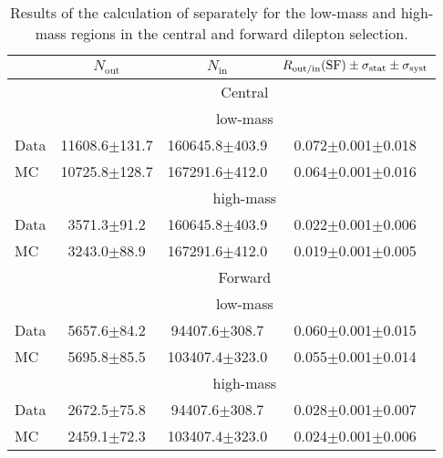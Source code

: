 
\begin{table}[hbtp]
 \renewcommand{\arraystretch}{1.3}
 \setlength{\belowcaptionskip}{6pt}
 \centering
 \caption{Results of the calculation of \Routin separately for the low-mass and high-mass regions in the central and forward dilepton selection.}
  \label{tab:rOutIn}
\begin{tabular}{l|c|c|c}     
 & $N_{\text{out}}$ & $N_{\text{in}}$ & $ R_\text{out/in} (\text{SF}) \pm \sigma_{\text{stat}} \pm \sigma_{\text{syst}}$  \\    
\hline
 & \multicolumn{3}{c}{Central} \\
\hline 
 & \multicolumn{3}{c}{low-mass}   \\ \hline
  Data & 11608.6$\pm$131.7 & 160645.8$\pm$403.9 & 0.072$\pm$0.001$\pm$0.018 \\
 MC & 10725.8$\pm$128.7 & 167291.6$\pm$412.0 & 0.064$\pm$0.001$\pm$0.016 \\

\hline 
& \multicolumn{3}{c}{high-mass} \\ 
\hline
 Data & 3571.3$\pm$91.2 & 160645.8$\pm$403.9 & 0.022$\pm$0.001$\pm$0.006 \\
 MC & 3243.0$\pm$88.9 & 167291.6$\pm$412.0 & 0.019$\pm$0.001$\pm$0.005 \\

 
    \hline 
& \multicolumn{3}{c}{Forward} \\
\hline 
 & \multicolumn{3}{c}{low-mass}   \\ \hline
  Data & 5657.6$\pm$84.2 & 94407.6$\pm$308.7 & 0.060$\pm$0.001$\pm$0.015 \\
 MC & 5695.8$\pm$85.5 & 103407.4$\pm$323.0 & 0.055$\pm$0.001$\pm$0.014 \\

\hline 
& \multicolumn{3}{c}{high-mass} \\ 
\hline
 Data & 2672.5$\pm$75.8 & 94407.6$\pm$308.7 & 0.028$\pm$0.001$\pm$0.007 \\
 MC & 2459.1$\pm$72.3 & 103407.4$\pm$323.0 & 0.024$\pm$0.001$\pm$0.006 \\


  
\end{tabular}  
\end{table}
